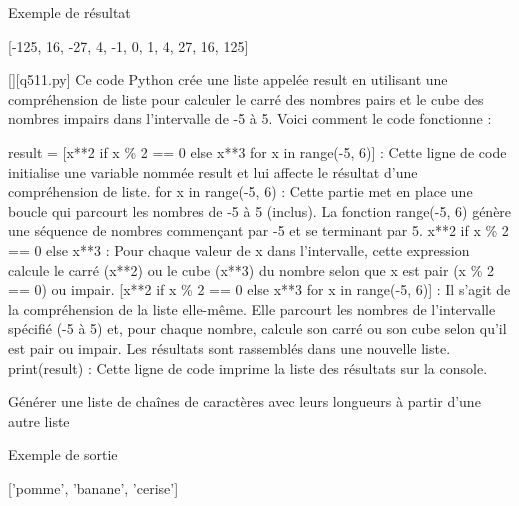 Exemple de résultat

[-125, 16, -27, 4, -1, 0, 1, 4, 27, 16, 125]
        \par
        \begin{solution}
            \renewcommand{\nomfichier}{q511.py}
            \pythonfile{\chemincode \nomfichier}[][\nomfichier]
            Ce code Python crée une liste appelée result en utilisant une compréhension de liste pour calculer le carré des nombres pairs et le cube des nombres impairs dans l'intervalle de -5 à 5. Voici comment le code fonctionne :

    result = [x**2 if x \% 2 == 0 else x**3 for x in range(-5, 6)] : Cette ligne de code initialise une variable nommée result et lui affecte le résultat d'une compréhension de liste.
        for x in range(-5, 6) : Cette partie met en place une boucle qui parcourt les nombres de -5 à 5 (inclus). La fonction range(-5, 6) génère une séquence de nombres commençant par -5 et se terminant par 5.
        x**2 if x \% 2 == 0 else x**3 : Pour chaque valeur de x dans l'intervalle, cette expression calcule le carré (x**2) ou le cube (x**3) du nombre selon que x est pair (x \% 2 == 0) ou impair.
        [x**2 if x \% 2 == 0 else x**3 for x in range(-5, 6)] : Il s'agit de la compréhension de la liste elle-même. Elle parcourt les nombres de l'intervalle spécifié (-5 à 5) et, pour chaque nombre, calcule son carré ou son cube selon qu'il est pair ou impair. Les résultats sont rassemblés dans une nouvelle liste.
    print(result) : Cette ligne de code imprime la liste des résultats sur la console.
        \end{solution}
        

        \question
        Générer une liste de chaînes de caractères avec leurs longueurs à partir d'une autre liste

Exemple de sortie

['pomme', 'banane', 'cerise']

